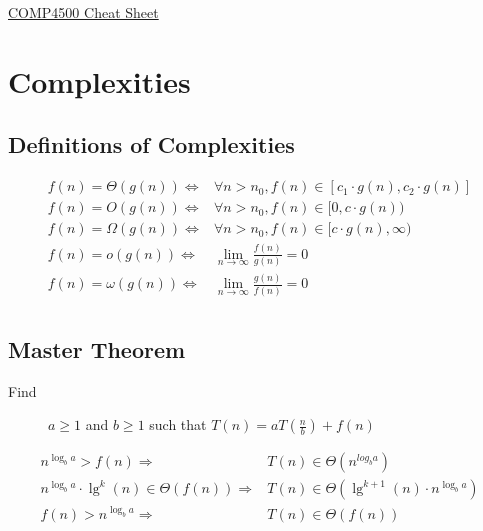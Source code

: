 \documentclass[landscape]{cheat}
\begin{document}
\begin{multicols*}{3}

\begin{center}
\Large{\underline{COMP4500 Cheat Sheet}} \\
\end{center}

\section{Complexities}

\subsection{Definitions of Complexities}
\begin{align*}
    f(n) = \Theta(g(n)) \Leftrightarrow& \forall n > n_0, f(n) \in [c_1 \cdot g(n), c_2 \cdot g(n)] \\
    f(n) = O(g(n)) \Leftrightarrow& \forall n > n_0, f(n) \in [0, c \cdot g(n)) \\
    f(n) = \Omega(g(n)) \Leftrightarrow& \forall n > n_0, f(n) \in [c \cdot g(n), \infty) \\
    f(n) = o(g(n)) \Leftrightarrow& \lim_{n \rightarrow \infty} \frac {f(n)} {g(n)} = 0 \\
    f(n) = \omega(g(n)) \Leftrightarrow& \lim_{n \rightarrow \infty} \frac {g(n)} {f(n)} = 0 \\
\end{align*}

\subsection{Master Theorem}
\begin{description}
    \item[Find] $a \geq 1$ and $b \geq 1$ such that $T(n) = a T\left(\frac n b\right) + f(n)$
\end{description}
\begin{align*}
    n^{\log_b a} > f(n) \Rightarrow& T(n) \in \Theta(n^{log_b a}) \\
    n^{\log_b a} \cdot \lg^k(n) \in \Theta(f(n)) \Rightarrow& T(n) \in \Theta(\lg^{k+1}(n) \cdot n^{\log_b a}) \\
    f(n) > n^{\log_b a} \Rightarrow& T(n) \in \Theta(f(n)) \\
\end{align*}


\end{multicols*}
\end{document}
